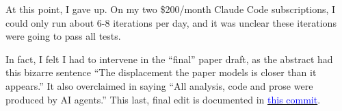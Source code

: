 \documentclass[12pt]{article}
\begin{document}
At this point, I gave up. On my two \$200/month Claude Code subscriptions, I could only run about 6-8 iterations per day, and it was unclear these iterations were going to pass all tests. 

In fact, I felt I had to intervene in the ``final'' paper draft, as the abstract had this bizarre sentence ``The displacement the paper models is closer than it appears.'' It also overclaimed in saying ``All analysis, code and prose were produced by AI agents.'' This last, final edit is documented in \href{https://github.com/redacted/ralph-wiggum-asset-pricing/commit/4bed451b406d6c1190ef42e33517946c980d822d}{\textcolor{blue}{this commit}}.


\nocite{NovyMarxVelikov2025,LuEtAl2024,HadfieldMenellHadfield2018,Bengio2023,KorinekSuh2024,Zhang2019,BabinaEtAl2024,ChenLopezLiraZimmermann2022}
\printbibliography
\end{document}

